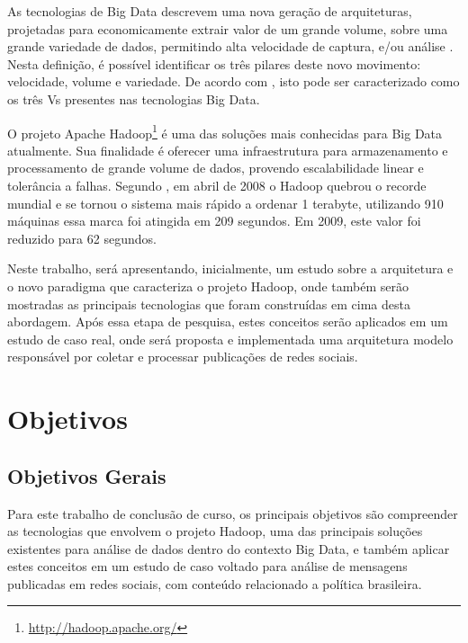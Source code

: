 As tecnologias de Big Data descrevem uma nova geração de arquiteturas, projetadas para economicamente extrair valor de um grande volume, sobre uma grande variedade de dados, permitindo alta velocidade de captura, e/ou análise \cite{gantz2011}. Nesta definição, é possível identificar os três pilares deste novo movimento: velocidade, volume e variedade. De acordo com , isto pode ser caracterizado como os três Vs presentes nas tecnologias Big Data.

O projeto Apache Hadoop\footnote{\url{http://hadoop.apache.org/}} é uma das soluções mais conhecidas para Big Data atualmente. Sua finalidade é oferecer uma infraestrutura para armazenamento e processamento de grande volume de dados, provendo escalabilidade linear e tolerância a falhas. Segundo , em abril de 2008 o Hadoop quebrou o recorde mundial e se tornou o sistema mais rápido a ordenar 1 terabyte, utilizando 910 máquinas essa marca foi atingida em 209 segundos. Em 2009, este valor foi reduzido para 62 segundos.

Neste trabalho, será apresentando, inicialmente, um estudo sobre a arquitetura e o novo paradigma que caracteriza o projeto Hadoop, onde também serão mostradas as principais tecnologias que foram construídas em cima desta abordagem. Após essa etapa de pesquisa, estes conceitos serão aplicados em um estudo de caso real, onde será proposta e implementada uma arquitetura modelo responsável por coletar e processar publicações de redes sociais.

 
\section{Objetivos}

\subsection{Objetivos Gerais}
 
Para este trabalho de conclusão de curso, os principais objetivos são compreender as tecnologias que envolvem o projeto Hadoop, uma das principais soluções existentes para análise de dados dentro do contexto Big Data, e também aplicar estes conceitos em um estudo de caso voltado para análise de mensagens publicadas em redes sociais, com conteúdo relacionado a política brasileira.
 
 
 
